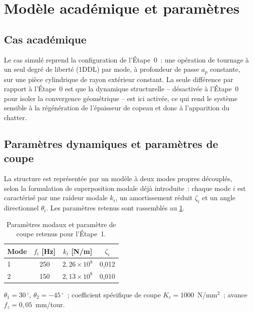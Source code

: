 \documentclass[
    11pt,
    a4paper
]{article}
\newcommand{\ap}{a_p}
\begin{document}
\section{Modèle académique et paramètres}
\label{sec-modele}

\subsection{Cas académique}
\label{sec-cas_academique}

Le cas simulé reprend la configuration de l'Étape~0~: une opération de
tournage à un seul degré de liberté (1DDL) par mode, à profondeur de passe
\(\ap\) constante, sur une pièce cylindrique de rayon extérieur constant. La
seule différence par rapport à l'Étape~0 est que la dynamique structurelle
-- désactivée à l'Étape~0 pour isoler la convergence géométrique -- est ici
activée, ce qui rend le système sensible à la régénération de l'épaisseur de
copeau et donc à l'apparition du chatter.


\subsection{Paramètres dynamiques et paramètres de coupe}
\label{sec-parametres}

La structure est représentée par un modèle à deux modes propres découplés,
selon la formulation de superposition modale déjà introduite~: chaque mode
\(i\) est caractérisé par une raideur modale \(k_i\), un amortissement réduit
\(\zeta_i\) et un angle directionnel \(\theta_i\). Les paramètres retenus
sont rassemblés au \cref{tab-parametres_modaux}.

\begin{table}[H]
    \centering
    \caption{Paramètres modaux et paramètre de coupe retenus pour l'Étape~1.}
    \label{tab-parametres_modaux}
    \begin{tabular}{lccc}
        \toprule
        Mode & \(f_i\) [Hz] & \(k_i\) [N/m] & \(\zeta_i\) \\
        \midrule
        1 & 250 & \(2,26\times10^{8}\) & 0,012 \\
        2 & 150 & \(2,13\times10^{8}\) & 0,010 \\
        \bottomrule
    \end{tabular}

    \vspace{0.5em}
    \(\theta_1 = 30\,^{\circ}\), \(\theta_2 = -45\,^{\circ}\)~;
    coefficient spécifique de coupe \(K_c = 1000\)~N/mm\(^2\)~;
    avance \(f_z = 0,05\)~mm/tour.
\end{table}
\end{document}
